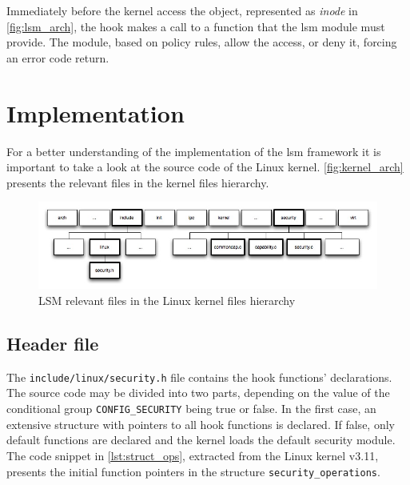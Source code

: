 \documentclass[]{article}
\begin{document}
Immediately before the kernel access the object, represented as \textit{inode} in \autoref{fig:lsm_arch}, the hook makes a call to a function that the \gls{lsm} module must provide. The module, based on policy rules, allow the access, or deny it, forcing an error code return.

\section{Implementation}

For a better understanding of the implementation of the \gls{lsm} framework it is important to take a look at the source code of the Linux kernel. \autoref{fig:kernel_arch} presents the relevant files in the kernel files hierarchy.   

\begin{figure}[htbp]
 \centering
 \includegraphics[scale=0.5]{images/kernel_arch.jpg}
 \caption{\gls{LSM} relevant files in the Linux kernel files hierarchy}
 \label{fig:kernel_arch}
\end{figure}

\subsection{Header file}

\noindent
The \texttt{include/linux/security.h} file contains the hook functions' declarations. The source code may be divided into two parts, depending on the value of the conditional group \texttt{CONFIG\_SECURITY} being true or false. In the first case, an extensive structure with pointers to all hook functions is declared. If false, only default functions are declared and the kernel loads the default security module. The code snippet in \autoref{lst:struct_ops}, extracted from the Linux kernel v3.11, presents the initial function pointers in the structure \texttt{security\_operations}.
\end{document}
